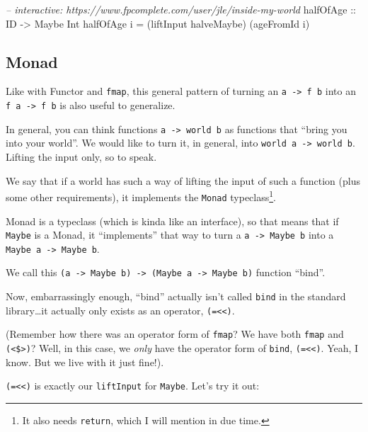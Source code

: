 \documentclass[]{article}
\newenvironment{Shaded}{}{}
\newcommand{\DataTypeTok}[1]{\textcolor[rgb]{0.56,0.13,0.00}{{#1}}}
\newcommand{\CommentTok}[1]{\textcolor[rgb]{0.38,0.63,0.69}{\textit{{#1}}}}
\newcommand{\OtherTok}[1]{\textcolor[rgb]{0.00,0.44,0.13}{{#1}}}
\newcommand{\FunctionTok}[1]{\textcolor[rgb]{0.02,0.16,0.49}{{#1}}}
\newcommand{\NormalTok}[1]{{#1}}
\begin{document}
\begin{Shaded}
\begin{Highlighting}[]
\CommentTok{-- interactive: https://www.fpcomplete.com/user/jle/inside-my-world}
\OtherTok{halfOfAge ::} \DataTypeTok{ID} \OtherTok{->} \DataTypeTok{Maybe} \DataTypeTok{Int}
\NormalTok{halfOfAge i }\FunctionTok{=} \NormalTok{(liftInput halveMaybe) (ageFromId i)}
\end{Highlighting}
\end{Shaded}

\subsection{Monad}\label{monad}

Like with Functor and \texttt{fmap}, this general pattern of turning an
\texttt{a\ -\textgreater{}\ f\ b} into an
\texttt{f\ a\ -\textgreater{}\ f\ b} is also useful to generalize.

In general, you can think functions
\texttt{a\ -\textgreater{}\ world\ b} as functions that ``bring you into
your world''. We would like to turn it, in general, into
\texttt{world\ a\ -\textgreater{}\ world\ b}. Lifting the input only, so
to speak.

We say that if a world has such a way of lifting the input of such a
function (plus some other requirements), it implements the
\texttt{Monad} typeclass\footnote{It also needs \texttt{return}, which I
  will mention in due time.}.

Monad is a typeclass (which is kinda like an interface), so that means
that if \texttt{Maybe} is a Monad, it ``implements'' that way to turn a
\texttt{a\ -\textgreater{}\ Maybe\ b} into a
\texttt{Maybe\ a\ -\textgreater{}\ Maybe\ b}.

We call this
\texttt{(a\ -\textgreater{}\ Maybe\ b)\ -\textgreater{}\ (Maybe\ a\ -\textgreater{}\ Maybe\ b)}
function ``bind''.

Now, embarrassingly enough, ``bind'' actually isn't called \texttt{bind}
in the standard library\ldots{}it actually only exists as an operator,
\texttt{(=\textless{}\textless{})}.

(Remember how there was an operator form of \texttt{fmap}? We have both
\texttt{fmap} and \texttt{(\textless{}\$\textgreater{})}? Well, in this
case, we \emph{only} have the operator form of \texttt{bind},
\texttt{(=\textless{}\textless{})}. Yeah, I know. But we live with it
just fine!).

\texttt{(=\textless{}\textless{})} is exactly our \texttt{liftInput} for
\texttt{Maybe}. Let's try it out:
\end{document}
